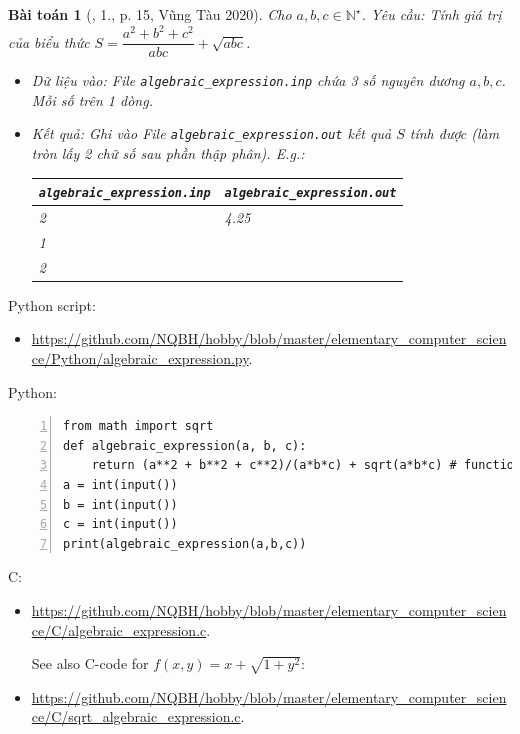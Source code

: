 \documentclass{article}
\newtheorem{baitoan}{Bài toán}
\begin{document}
\begin{baitoan}[\cite{VietSTEM2021}, 1., p. 15, Vũng Tàu 2020]
	Cho $a,b,c\in\mathbb{N}^\star$. {\sf Yêu cầu:} Tính giá trị của biểu thức $S = \dfrac{a^2 + b^2 + c^2}{abc} + \sqrt{abc}$.
	\begin{itemize}
		\item {\sf Dữ liệu vào:} File \verb|algebraic_expression.inp| chứa 3 số nguyên dương $a,b,c$. Mỗi số trên 1 dòng.
		\item {\sf Kết quả:} Ghi vào File \verb|algebraic_expression.out| kết quả $S$ tính được (làm tròn lấy 2 chữ số sau phần thập phân). E.g.:
		\begin{table}[H]
			\centering
			\begin{tabular}{|l|l|}
				\hline
				\verb|algebraic_expression.inp| & \verb|algebraic_expression.out| \\
				\hline
				2 & 4.25 \\
				1 &  \\
				2 &  \\
				\hline
			\end{tabular}
		\end{table}
	\end{itemize}
\end{baitoan}
Python script:
\begin{itemize}
	\item \url{https://github.com/NQBH/hobby/blob/master/elementary_computer_science/Python/algebraic_expression.py}.
\end{itemize}
Python:
\begin{Verbatim}[numbers=left,xleftmargin=5mm]
from math import sqrt
def algebraic_expression(a, b, c):
    return (a**2 + b**2 + c**2)/(a*b*c) + sqrt(a*b*c) # function f(a,b,c) can be modified
a = int(input())
b = int(input())
c = int(input())
print(algebraic_expression(a,b,c))
\end{Verbatim}
C:
\begin{itemize}
	\item \url{https://github.com/NQBH/hobby/blob/master/elementary_computer_science/C/algebraic_expression.c}.
	
	See also C-code for $f(x,y) = x + \sqrt{1 + y^2}$:
	\item \url{https://github.com/NQBH/hobby/blob/master/elementary_computer_science/C/sqrt_algebraic_expression.c}.
\end{itemize}
\end{document}

